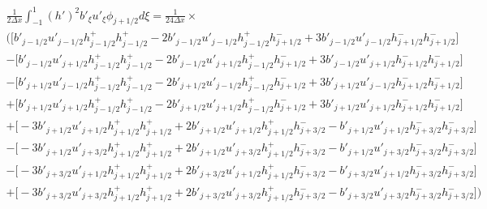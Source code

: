\documentclass[12pt]{article}
\begin{document}
\begin{multline}
\frac{1}{2\Delta x}\int_{-1}^{1} {(h')^2}b'_{\xi} u'_{\xi} \phi_{j+1/2} d\xi =  \frac{1}{24\Delta x} \times\\ \bigg(\bigg[b'_{j-1/2}u'_{j-1/2} h^+_{j-1/2}h^+_{j-1/2} - 2b'_{j-1/2}u'_{j-1/2}h^+_{j-1/2}h^-_{j+1/2} +3 b'_{j-1/2}u'_{j-1/2}h^-_{j+1/2}h^-_{j+1/2} \bigg] \\- \bigg[ b'_{j-1/2}u'_{j+1/2}h^+_{j-1/2}h^+_{j-1/2} - 2b'_{j-1/2}u'_{j+1/2}h^+_{j-1/2}h^-_{j+1/2} + 3b'_{j-1/2}u'_{j+1/2}h^-_{j+1/2}h^-_{j+1/2} \bigg] \\- \bigg[ b'_{j+1/2} u'_{j-1/2}h^+_{j-1/2}h^+_{j-1/2}  - 2b'_{j+1/2} u'_{j-1/2}h^+_{j-1/2}h^-_{j+1/2} +3 b'_{j+1/2} u'_{j-1/2}h^-_{j+1/2}h^-_{j+1/2} \bigg]\\+ \bigg[ b'_{j+1/2}u'_{j+1/2}h^+_{j-1/2}h^+_{j-1/2} - 2b'_{j+1/2}u'_{j+1/2}h^+_{j-1/2}h^-_{j+1/2}+ 3b'_{j+1/2}u'_{j+1/2}h^-_{j+1/2}h^-_{j+1/2} \bigg] \\
+ \bigg[-3b'_{j+1/2}u'_{j+1/2} h^+_{j+1/2}h^+_{j+1/2}+ 2b'_{j+1/2}u'_{j+1/2} h^+_{j+1/2}h^-_{j+3/2} - b'_{j+1/2}u'_{j+1/2} h^-_{j+3/2}h^-_{j+3/2} \bigg] \\- \bigg[-3b'_{j+1/2}u'_{j+3/2}h^+_{j+1/2}h^+_{j+1/2} + 2b'_{j+1/2}u'_{j+3/2}h^+_{j+1/2}h^-_{j+3/2}  - b'_{j+1/2}u'_{j+3/2}h^-_{j+3/2}h^-_{j+3/2}\bigg] \\- \bigg[-3b'_{j+3/2} u'_{j+1/2}h^+_{j+1/2}h^+_{j+1/2} + 2b'_{j+3/2} u'_{j+1/2}h^+_{j+1/2}h^-_{j+3/2}- b'_{j+3/2} u'_{j+1/2}h^-_{j+3/2}h^-_{j+3/2}\bigg] \\+ \bigg[-3b'_{j+3/2} u'_{j+3/2}h^+_{j+1/2}h^+_{j+1/2} + 2b'_{j+3/2} u'_{j+3/2}h^+_{j+1/2}h^-_{j+3/2} - b'_{j+3/2} u'_{j+3/2}h^-_{j+3/2}h^-_{j+3/2}\bigg] \bigg)
\end{multline}
\end{document}
